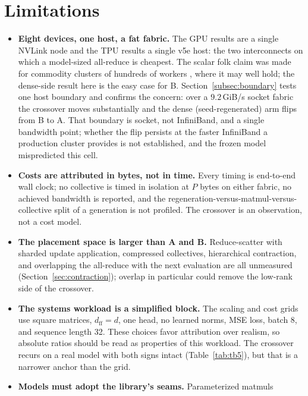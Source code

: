 \section{Limitations}
\label{sec:limitations}

\begin{itemize}
  \item \textbf{Eight devices, one host, a fat fabric.} The GPU results are
    a single NVLink node and the TPU results a single v5e host: the two
    interconnects on which a model-sized all-reduce is cheapest. The scalar
    folk claim was made for commodity clusters of hundreds of workers
    \citep{salimans2017}, where it may well hold; the dense-side result here
    is the easy case for B. Section~\ref{subsec:boundary} tests one host boundary and confirms the
    concern: over a $9.2$\,GiB/s socket fabric the crossover moves
    substantially and the dense (seed-regenerated) arm flips from B to A.
    That boundary is socket, not InfiniBand, and a single bandwidth point;
    whether the flip persists at the faster InfiniBand a production cluster
    provides is not established, and the frozen model mispredicted this
    cell.
  \item \textbf{Costs are attributed in bytes, not in time.} Every timing
    is end-to-end wall clock; no collective is timed in isolation at $P$
    bytes on either fabric, no achieved bandwidth is reported, and the
    regeneration-versus-matmul-versus-collective split of a generation is
    not profiled. The crossover is an observation, not a cost model.
  \item \textbf{The placement space is larger than A and B.} Reduce-scatter
    with sharded update application, compressed collectives, hierarchical
    contraction, and overlapping the all-reduce with the next evaluation are
    all unmeasured (Section~\ref{sec:contraction}); overlap in particular
    could remove the low-rank side of the crossover.
  \item \textbf{The systems workload is a simplified block.} The scaling and
    cost grids use square matrices, $d_{\mathrm{ff}}{=}d$, one head, no
    learned norms, MSE loss, batch 8, and sequence length 32. These choices
    favor attribution over realism, so absolute ratios should be read as
    properties of this workload. The crossover recurs on a real model with
    both signs intact (Table~\ref{tab:tb5}), but that is a narrower anchor than
    the grid.
  \item \textbf{Models must adopt the library's seams.} Parameterized matmuls

\end{itemize}
